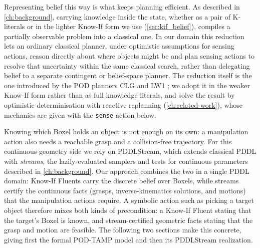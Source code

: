 Representing belief this way is what keeps planning efficient. As described in \cref{ch:background}, carrying knowledge inside the state, whether as a pair of K-literals or in the lighter Know-If form we use (\cref{sec:kif_belief}), compiles a partially observable problem into a classical one. In our domain this reduction lets an ordinary classical planner, under optimistic assumptions for sensing actions, reason directly about where objects might be and plan sensing actions to resolve that uncertainty within the same classical search, rather than delegating belief to a separate contingent or belief-space planner. The reduction itself is the one introduced by the POD planners CLG and LW1 \cite{albore2009translation, bonet2014flexible}; we adopt it in the weaker Know-If form rather than as full knowledge literals, and solve the result by optimistic determinisation with reactive replanning (\cref{ch:related-work}), whose mechanics are given with the \texttt{sense} action below.

Knowing which Boxel holds an object is not enough on its own: a manipulation action also needs a reachable grasp and a collision-free trajectory. For this continuous-geometry side we rely on PDDLStream, which extends classical PDDL with \emph{streams}, the lazily-evaluated samplers and tests for continuous parameters described in \cref{ch:background}. Our approach combines the two in a single PDDL domain: Know-If Fluents carry the discrete belief over Boxels, while streams certify the continuous facts (grasps, inverse-kinematics solutions, and motions) that the manipulation actions require. A symbolic action such as picking a target object therefore mixes both kinds of precondition: a Know-If Fluent stating that the target's Boxel is known, and stream-certified geometric facts stating that the grasp and motion are feasible. The following two sections make this concrete, giving first the formal POD-TAMP model and then its PDDLStream realization.

